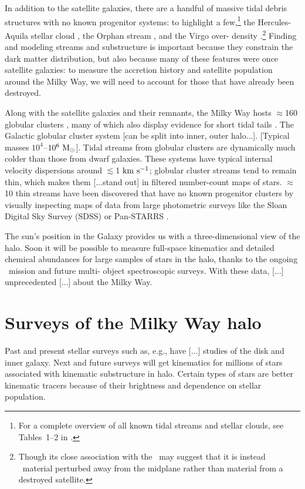 In addition to the satellite galaxies, there are a handful of massive tidal
debris structures with no known progenitor systems: to highlight a
few,\footnote{For a complete overview of all known tidal streams and stellar
clouds, see Tables~1--2 in \cite{grillmair16}.} the Hercules-Aquila stellar
cloud \citep{belokurov07b}, the Orphan stream \citep{grillmair06b}, and the
Virgo over- density \citep{juric08}.\footnote{Though its close association with
the \mwdisk\ may suggest that it is instead \mwdisk\ material perturbed away
from the midplane rather than material from a destroyed satellite.} Finding and
modeling streams and substructure is important because they constrain the dark
matter distribution, but also because many of these features were once satellite
galaxies: to measure the accretion history and satellite population around the
Milky Way, we will need to account for those that have already been destroyed.

Along with the satellite galaxies and their remnants, the Milky Way hosts
$\approx$160 globular clusters \citep{harris10}, many of which also display
evidence for short tidal tails \citep{grillmair95, leon00}. The Galactic
globular cluster system [can be split into inner, outer halo...]. [Typical
masses $10^4$--$10^6~\mathrm{M}_\odot$]. Tidal streams from globular clusters are
dynamically much colder than those from dwarf galaxies. These systems have
typical internal velocity dispersions around $\lesssim$1$~\mathrm{km}~\mathrm{s}^{-1}$; globular
cluster streams tend to remain thin, which makes them [...stand out] in
filtered number-count maps of stars. $\approx$10 thin streams have been
discovered that have no known progenitor clusters by visually inspecting maps
of data from large photometric surveys like the Sloan Digital Sky Survey (SDSS)
or Pan-STARRS \citep[e.g.,][]{grillmair06a, bonaca12, bernard14}.

The sun's position in the Galaxy provides us with a three-dimensional view of
the halo. Soon it will be possible to measure full-space kinematics and detailed
chemical abundances for large samples of stars in the halo, thanks to the
ongoing \gaia\ mission and future multi- object spectroscopic surveys. With
these data, [...] unprecedented [...] about the Milky Way.

\section{Surveys of the Milky Way halo} \label{sec:mw-surveys}

Past and present stellar surveys such as, e.g., have [...] studies of the disk
and inner galaxy. Next and future surveys will get kinematics for millions of
stars associated with kinematic substructure in halo. Certain types of stars are
better kinematic tracers because of their brightness and dependence on stellar
population.

